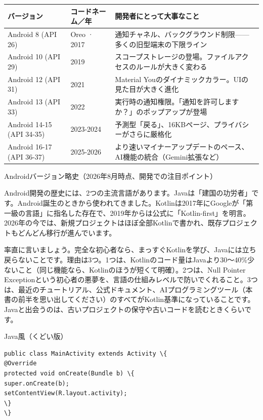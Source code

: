 \begin{center}
\begin{tabularx}{\linewidth}{|X|X|X|}
\hline
\textbf{バージョン} & \textbf{コードネーム／年} & \textbf{開発者にとって大事なこと} \tabularnewline
\hline
Android 8 (API 26) & Oreo · 2017 & 通知チャネル、バックグラウンド制限——多くの旧型端末の下限ライン \tabularnewline
Android 10 (API 29) & 2019 & スコープストレージの登場。ファイルアクセスのルールが大きく変わる \tabularnewline
Android 12 (API 31) & 2021 & Material Youのダイナミックカラー。UIの見た目が大きく進化 \tabularnewline
Android 13 (API 33) & 2022 & 実行時の通知権限。「通知を許可しますか？」のポップアップが登場 \tabularnewline
Android 14-15 (API 34-35) & 2023-2024 & 予測型「戻る」、16KBページ、プライバシーがさらに厳格化 \tabularnewline
Android 16-17 (API 36-37) & 2025-2026 & より速いマイナーアップデートのペース、AI機能の統合（Gemini拡張など） \tabularnewline
\hline
\end{tabularx}
\end{center}

\begin{center}\small\color{gray}Androidバージョン略史（2026年8月時点、開発での注目ポイント）\end{center}


Android開発の歴史には、2つの主流言語があります。Javaは「建国の功労者」です。Android誕生のときから使われてきました。Kotlinは2017年にGoogleが「第一級の言語」に指名した存在で、2019年からは公式に「Kotlin-first」を明言。2026年の今では、新規プロジェクトはほぼ全部Kotlinで書かれ、既存プロジェクトもどんどん移行が進んでいます。

率直に言いましょう。完全な初心者なら、まっすぐKotlinを学び、Javaには立ち戻らないことです。理由は3つ。1つは、Kotlinのコード量はJavaより30〜40\%少ないこと（同じ機能なら、Kotlinのほうが短くて明確）。2つは、Null Pointer Exceptionという初心者の悪夢を、言語の仕組みレベルで防いでくれること。3つは、最近のチュートリアル、公式ドキュメント、AIプログラミングツール（本書の前半を思い出してください）のすべてがKotlin基準になっていることです。Javaと出会うのは、古いプロジェクトの保守や古いコードを読むときくらいです。

Java風（くどい版）

\begin{lstlisting}
public class MainActivity extends Activity \{
@Override
protected void onCreate(Bundle b) \{
super.onCreate(b);
setContentView(R.layout.activity);
\}
\}
\end{lstlisting}

